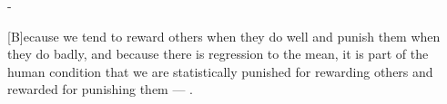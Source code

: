 \documentclass[9pt,a4paper,titlepage,showtrims]{memoir}
\numberwithin{equation}{chapter}
\begin{document}
\frontmatter



\begin{titlingpage}
  \vspace*{-2cm}
  \calccentering{\unitlength}
  \begin{adjustwidth*}{\unitlength-1cm}{-\unitlength-1cm}
    \maketitle
  \end{adjustwidth*}
\end{titlingpage}


[B]ecause we tend to reward others when they do well and punish them when they do badly, and because there is regression to the mean, it is part of the human condition that we are statistically punished for rewarding others and rewarded for punishing them --- \cite{Kahneman2012}.

\cleartorecto
{}


\cleartorecto
{}


\end{document}
